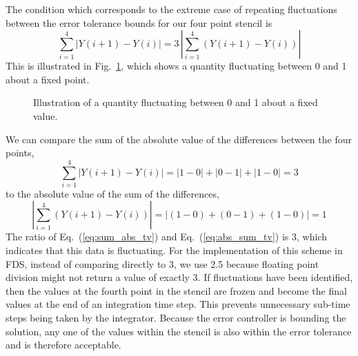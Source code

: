 The condition which corresponds to the extreme case of repeating fluctuations between the error tolerance bounds for our four point stencil is
\begin{equation}\label{eq:TV}
\sum_{i=1}^{4}|Y(i+1)-Y(i)| = 3 \, |\sum_{i=1}^{4}(Y(i+1)-Y(i))|
\end{equation}
This is illustrated in Fig.~\ref{fig:TV}, which shows a quantity fluctuating between 0 and 1 about a fixed point.
\begin{figure}
\begin{center}
\caption{\label{fig:TV} Illustration of a quantity fluctuating between 0 and 1 about a fixed value.}
\end{center}
\end{figure}
We can compare the sum of the absolute value of the differences between the four points,
\begin{equation}\label{eq:sum_abs_tv}
\displaystyle \sum_{i=1}^{4}|Y(i+1)-Y(i)| = |1-0| + |0-1| + |1-0| = 3
\end{equation}
to the absolute value of the sum of the differences,
\begin{equation}\label{eq:abs_sum_tv}
|\displaystyle \sum_{i=1}^{4}(Y(i+1)-Y(i))| = |(1-0)+(0-1)+(1-0)| = 1
\end{equation}
The ratio of Eq.~(\ref{eq:sum_abs_tv}) and Eq.~(\ref{eq:abs_sum_tv}) is 3, which indicates that this data is fluctuating. For the implementation of this scheme in FDS, instead of comparing directly to 3, we use 2.5 because floating point division might not return a value of exactly 3. If fluctuations have been identified, then the values at the fourth point in the stencil are frozen and become the final values at the end of an integration time step. This prevents unnecessary sub-time steps being taken by the integrator. Because the error controller is bounding the solution, any one of the values within the stencil is also within the error tolerance and is therefore acceptable.

